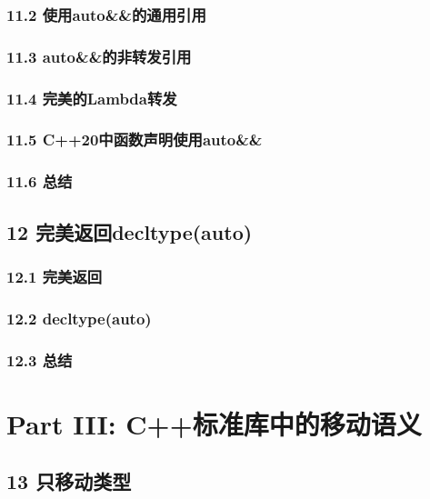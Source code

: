 \documentclass[11pt,a4paper,UTF8]{ctexart}
\begin{document}
		\subsubsection{11.2 使用auto\&\&的通用引用}
		
		\subsubsection{11.3 auto\&\&的非转发引用}
		
		\subsubsection{11.4 完美的Lambda转发}
		
		\subsubsection{11.5 C++20中函数声明使用auto\&\&}
		
		\subsubsection{11.6 总结}
		
	\subsection{12 完美返回decltype(auto)}
	
		\subsubsection{12.1 完美返回}
		
		\subsubsection{12.2 decltype(auto)}
		
		\subsubsection{12.3 总结}
		
		
	\section{Part III: C++标准库中的移动语义}
	
	\subsection{13 只移动类型}
	
\end{document}

